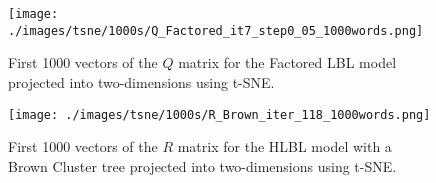 
\begin{figure}[ht]
\texttt{[image: ./images/tsne/1000s/Q\_Factored\_it7\_step0\_05\_1000words.png]} 
\centering
\caption{First 1000 vectors of the $Q$ matrix for the Factored LBL model projected into two-dimensions using t-SNE.}
\end{figure}






\begin{figure}[ht]
\texttt{[image: ./images/tsne/1000s/R\_Brown\_iter\_118\_1000words.png]} 
\centering
\caption{First 1000 vectors of the $R$ matrix for the HLBL model with a Brown Cluster tree projected into two-dimensions using t-SNE.}
\end{figure}
%
%
%
%

